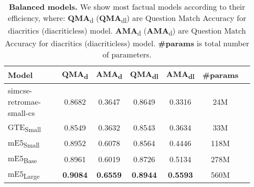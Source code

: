 \begin{table*}[ht!]
    \centering
    \begin{tabular}{lcccccc}
      \toprule
      \textbf{Model} & \textbf{QMA}\textsubscript{d} & \textbf{AMA}\textsubscript{d} & \textbf{QMA}\textsubscript{dl} & \textbf{AMA}\textsubscript{dl} & \textbf{\#params} \\
      \midrule
      simcse-retromae-small-cs & 0.8682 & 0.3647 & 0.8649 & 0.3316 & 24M \\
      GTE\textsubscript{Small} & 0.8549 & 0.3632 & 0.8543 & 0.3634 & 33M \\
      mE5\textsubscript{Small} & 0.8952 & 0.6078 & 0.8564 & 0.4446 & 118M \\
      mE5\textsubscript{Base} & 0.8961 & 0.6019 & 0.8726 & 0.5134 & 278M \\
      mE5\textsubscript{Large} & \textbf{0.9084} & \textbf{0.6559} & \textbf{0.8944} & \textbf{0.5593} & 560M \\

      
      \bottomrule
    \end{tabular}
    \caption{\textbf{Balanced models.}
    We show most factual models according to their efficiency, where:
    \textbf{QMA}\textsubscript{d} (\textbf{QMA}\textsubscript{dl}) are Question Match Accuracy for diacritics (diacriticless) model.
    \textbf{AMA}\textsubscript{d} (\textbf{AMA}\textsubscript{d}) are Question Match Accuracy for diacritics (diacriticless) model.
    \textbf{\#params} is total number of parameters.}
    \label{tab:balanced}
  \end{table*}
  